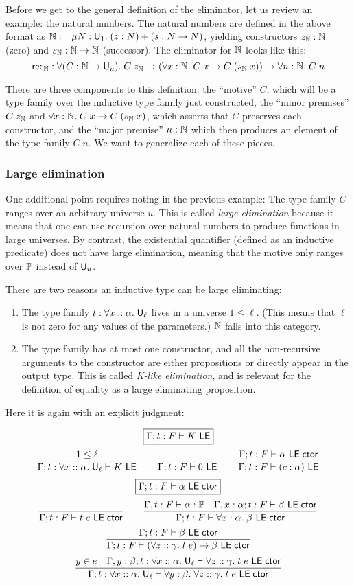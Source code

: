 Before we get to the general definition of the eliminator, let us review an example: the natural numbers. The natural numbers are defined in the above format as $\N:=\mu N:\U_1.\;(z:N)+(s:N\to N)$, yielding constructors $z_\N:\N$ (zero) and $s_\N:\N\to\N$ (successor). The eliminator for $\N$ looks like this:
$$\mathsf{rec}_\N:\forall (C:\N\to \U_u).\;C\;z_\N\to(\forall x:\N.\;C\;x\to C\;(s_\N\;x))\to\forall n:\N.\;C\;n$$

There are three components to this definition: the ``motive'' $C$, which will be a type family over the inductive type family just constructed, the ``minor premises'' $C\;z_\N$ and $\forall x:\N.\;C\;x\to C\;(s_\N\;x)$, which asserts that $C$ preserves each constructor, and the ``major premise'' $n:\N$ which then produces an element of the type family $C\;n$. We want to generalize each of these pieces.

\subsubsection{Large elimination}\label{sec:large_elim}
One additional point requires noting in the previous example: The type family $C$ ranges over an arbitrary universe $u$. This is called \emph{large elimination} because it means that one can use recursion over natural numbers to produce functions in large universes. By contrast, the existential quantifier (defined as an inductive predicate) does not have large elimination, meaning that the motive only ranges over $\P$ instead of $\U_u$.

There are two reasons an inductive type can be large eliminating:
\begin{enumerate}
\item The type family $t:\forall x::\alpha.\;\U_\ell$ lives in a universe $1\le\ell$. (This means that $\ell$ is not zero for any values of the parameters.) $\N$ falls into this category.
\item The type family has at most one constructor, and all the non-recursive arguments to the constructor are either propositions or directly appear in the output type. This is called \emph{K-like elimination}, and is relevant for the definition of equality as a large eliminating proposition.
\end{enumerate}
Here it is again with an explicit judgment:

$$\boxed{\Gamma;t:F\vdash K\LE}$$
$$\frac{1\le\ell}{\Gamma;t:\forall x::\alpha.\;\U_\ell\vdash K\LE}\qquad
\frac{}{\Gamma;t:F\vdash 0\LE}\qquad
\frac{\Gamma;t:F\vdash \alpha\LEctor}{\Gamma;t:F\vdash (c:\alpha)\LE}$$
$$\boxed{\Gamma;t:F\vdash \alpha\LEctor}$$
$$\frac{}{\Gamma;t:F\vdash t\;e\LEctor}\qquad
\frac{\Gamma,t:F\vdash \alpha:\P\quad \Gamma,x:\alpha;t:F\vdash\beta\LEctor}{\Gamma;t:F\vdash\forall x:\alpha.\;\beta\LEctor}$$
$$\frac{\Gamma;t:F\vdash\beta\LEctor}{\Gamma;t:F\vdash(\forall z::\gamma.\;t\;e)\to\beta\LEctor}$$
$$\frac{y\in e\quad \Gamma,y:\beta;t:\forall x::\alpha.\;\U_\ell\vdash\forall z::\gamma.\; t\;e\LEctor}{\Gamma;t:\forall x::\alpha.\;\U_\ell\vdash\forall y:\beta.\;\forall z::\gamma.\;t\;e\LEctor}$$

